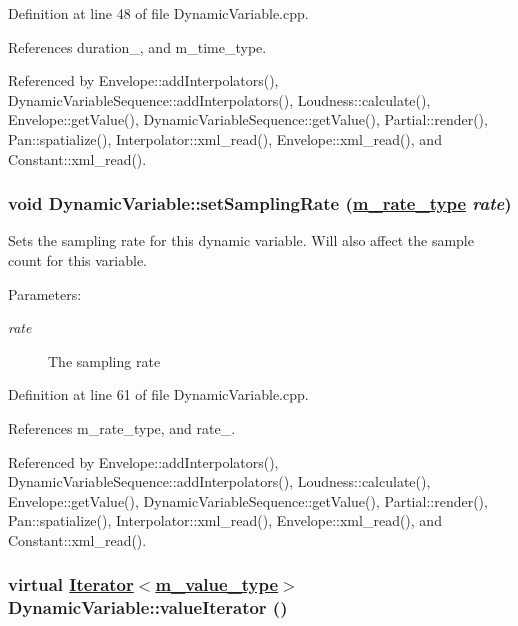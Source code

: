 Definition at line 48 of file Dynamic\-Variable.cpp.

References duration\_\-, and m\_\-time\_\-type.

Referenced by Envelope::add\-Interpolators(), Dynamic\-Variable\-Sequence::add\-Interpolators(), Loudness::calculate(), Envelope::get\-Value(), Dynamic\-Variable\-Sequence::get\-Value(), Partial::render(), Pan::spatialize(), Interpolator::xml\_\-read(), Envelope::xml\_\-read(), and Constant::xml\_\-read().\hypertarget{classDynamicVariable_a8}{
\subsubsection[setSamplingRate]{\setlength{\rightskip}{0pt plus 5cm}void Dynamic\-Variable::set\-Sampling\-Rate (\hyperlink{Types_8h_a4}{m\_\-rate\_\-type} {\em rate})}}
\label{classDynamicVariable_a8}


Sets the sampling rate for this dynamic variable. Will also affect the sample count for this variable. \begin{Desc}
\item[Parameters:]
\begin{description}
\item[{\em rate}]The sampling rate \end{description}
\end{Desc}


Definition at line 61 of file Dynamic\-Variable.cpp.

References m\_\-rate\_\-type, and rate\_\-.

Referenced by Envelope::add\-Interpolators(), Dynamic\-Variable\-Sequence::add\-Interpolators(), Loudness::calculate(), Envelope::get\-Value(), Dynamic\-Variable\-Sequence::get\-Value(), Partial::render(), Pan::spatialize(), Interpolator::xml\_\-read(), Envelope::xml\_\-read(), and Constant::xml\_\-read().\hypertarget{classDynamicVariable_a3}{
\subsubsection[valueIterator]{\setlength{\rightskip}{0pt plus 5cm}virtual \hyperlink{classIterator}{Iterator}$<$\hyperlink{Types_8h_a3}{m\_\-value\_\-type}$>$ Dynamic\-Variable::value\-Iterator ()}}
\label{classDynamicVariable_a3}


